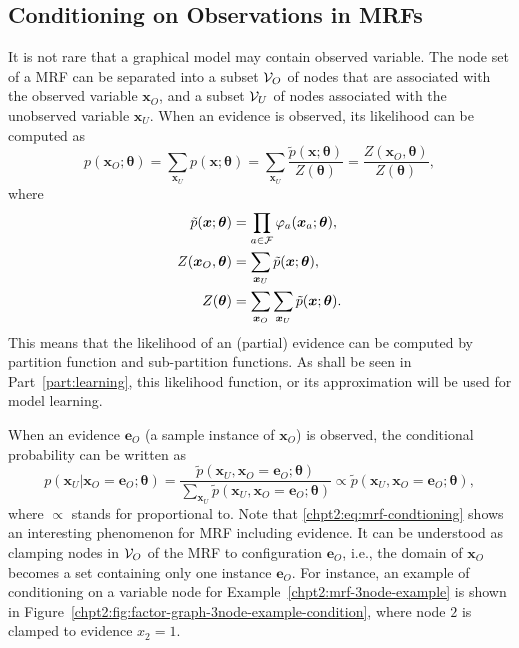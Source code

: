 \subsection{Conditioning on Observations in MRFs}
It is not rare that a graphical model may contain observed variable. The node set of a MRF can be separated into a subset $\mathcal{V}_O$ of nodes that are associated with the observed variable $\bm{x}_O$, and a subset $\mathcal{V}_U$ of nodes associated with the unobserved variable $\bm{x}_U$. When an evidence is observed, its likelihood can be computed as
\begin{equation}
  p(\bm{x}_O;\bm{\theta}) = \sum_{\bm{x}_U} p(\bm{x};\bm{\theta}) =\sum_{\bm{x}_U}\frac{\tilde{p}(\bm{x}; \bm{\theta})}{Z(\bm{\theta})} = \frac{Z(\bm{x}_O,\bm{\theta})}{Z(\bm{\theta})},
\end{equation}
where 
\begin{align}
  \tilde{p}(\bm{x}; \bm{\theta}) &= \prod_{a \in \mathcal{F}} \varphi_{a}(\bm{x}_{a};\bm{\theta}), \nonumber \\
  Z(\bm{x}_O, \bm{\theta}) &= \sum_{\bm{x}_U} \tilde{p}(\bm{x}; \bm{\theta}), \nonumber \\
  Z(\bm{\theta}) &= \sum_{\bm{x}_O}\sum_{\bm{x}_U} \tilde{p}(\bm{x}; \bm{\theta}).
\end{align}
This means that the likelihood of an (partial) evidence can be computed by partition function and sub-partition functions. As shall be seen in Part~\ref{part:learning}, this likelihood function, or its approximation will be used for model learning.

 When an evidence $\bm{e}_O$ (a sample instance of $\bm{x}_O$) is observed, the conditional probability can be written as
\begin{equation}\label{chpt2:eq:mrf-condtioning}
  p(\bm{x}_U|\bm{x}_O=\bm{e}_O;\bm{\theta}) = \frac{\tilde{p}(\bm{x}_U, \bm{x}_O = \bm{e}_O; \bm{\theta})}{\sum_{\bm{x}_U}\tilde{p}(\bm{x}_U, \bm{x}_O = \bm{e}_O; \bm{\theta})} \propto \tilde{p}(\bm{x}_U, \bm{x}_O = \bm{e}_O; \bm{\theta}),
\end{equation}
where $\propto$ stands for proportional to. Note that \eqref{chpt2:eq:mrf-condtioning} shows an interesting phenomenon for MRF including evidence. It can be understood as clamping nodes in $\mathcal{V}_O$ of the MRF to configuration $\bm{e}_O$, i.e., the domain of $\bm{x}_O$ becomes a set containing only one instance $\bm{e}_O$. For instance, an example of conditioning on a variable node for Example~\ref{chpt2:mrf-3node-example} is shown in Figure~\ref{chpt2:fig:factor-graph-3node-example-condition}, where node $2$ is clamped to evidence $x_2=1$.



